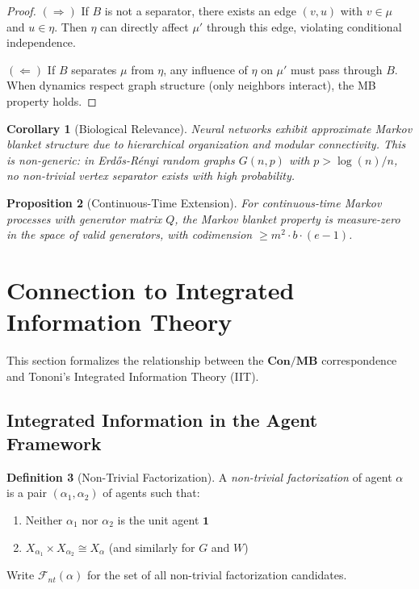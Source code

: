 \documentclass[11pt,a4paper]{article}
\theoremstyle{definition}
\newtheorem{definition}{Definition}[section]
\theoremstyle{plain}
\newtheorem{proposition}[definition]{Proposition}
\newtheorem{corollary}[definition]{Corollary}
\theoremstyle{remark}
\newcommand{\Con}{\mathbf{Con}}
\newcommand{\MB}{\mathbf{MB}}
\begin{document}
\begin{proof}
$(\Rightarrow)$ If $B$ is not a separator, there exists an edge $(v, u)$ with $v \in \mu$ and $u \in \eta$. Then $\eta$ can directly affect $\mu'$ through this edge, violating conditional independence.

$(\Leftarrow)$ If $B$ separates $\mu$ from $\eta$, any influence of $\eta$ on $\mu'$ must pass through $B$. When dynamics respect graph structure (only neighbors interact), the MB property holds.
\end{proof}

\begin{corollary}[Biological Relevance]
Neural networks exhibit approximate Markov blanket structure due to hierarchical organization and modular connectivity. This is non-generic: in Erd\H{o}s-R\'enyi random graphs $G(n, p)$ with $p > \log(n)/n$, no non-trivial vertex separator exists with high probability.
\end{corollary}

\begin{proposition}[Continuous-Time Extension]\label{prop:continuous-time}
For continuous-time Markov processes with generator matrix $Q$, the Markov blanket property is measure-zero in the space of valid generators, with codimension $\geq m^2 \cdot b \cdot (e-1)$.
\end{proposition}

\section{Connection to Integrated Information Theory}\label{sec:iit}

This section formalizes the relationship between the $\Con/\MB$ correspondence and Tononi's Integrated Information Theory (IIT).

\subsection{Integrated Information in the Agent Framework}

\begin{definition}[Non-Trivial Factorization]\label{def:nontrivial-factorization}
A \emph{non-trivial factorization} of agent $\alpha$ is a pair $(\alpha_1, \alpha_2)$ of agents such that:
\begin{enumerate}[label=(\roman*)]
    \item Neither $\alpha_1$ nor $\alpha_2$ is the unit agent $\mathbf{1}$
    \item $X_{\alpha_1} \times X_{\alpha_2} \cong X_\alpha$ (and similarly for $G$ and $W$)
\end{enumerate}
Write $\mathcal{F}_{nt}(\alpha)$ for the set of all non-trivial factorization candidates.
\end{definition}
\end{document}
